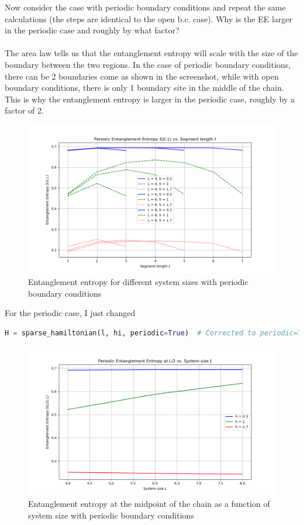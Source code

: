 \documentclass[12pt]{article}
\begin{document}
Now consider the case with periodic boundary conditions and repeat the same calculations (the steps are identical to the open b.c. case). Why is the EE larger in the periodic case and roughly by what factor? \\\\
The area law tells us that the entanglement entropy will scale with the size of the boundary between the two regions. In the case of periodic boundary conditions, there can be 2 boundaries come as shown in the screenshot, while with open boundary conditions, there is only 1 boundary site in the middle of the chain. This is why the entanglement entropy is larger in the periodic case, roughly by a factor of 2.
\begin{figure}
\centering
\includegraphics[width=\textwidth]{entanglement_entropy_periodic.png}
\caption{Entanglement entropy for different system sizes with periodic boundary conditions}
\end{figure}
For the periodic case, I just changed
\begin{lstlisting}[language=Python]
H = sparse_hamiltonian(l, hi, periodic=True)  # Corrected to periodic=True as needed
\end{lstlisting}
\begin{figure}
\centering
\includegraphics[width=\textwidth]{entanglement_entropy_L2_periodic.png}
\caption{Entanglement entropy at the midpoint of the chain as a function of system size with periodic boundary conditions}
\end{figure}
\end{document}
